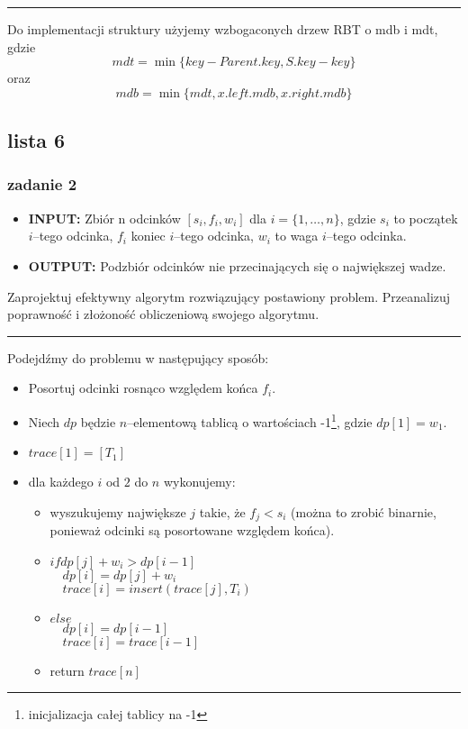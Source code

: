 \documentclass[11pt,a4paper]{article}
\begin{document}
\bigskip
\hrule
\bigskip

Do implementacji struktury użyjemy wzbogaconych drzew RBT o mdb i mdt, gdzie
\[
    mdt = \min\{key- Parent.key, S.key-key\}
\]
oraz
\[
    mdb = \min\{mdt, x.left.mdb, x.right.mdb\}
\]

\subsection{lista 6}
\subsubsection{zadanie 2}
\begin{itemize}
    \item \textbf{INPUT:} Zbiór n odcinków $[s_i, f_i, w_i]$ dla $i = \{1,\dots, n\}$, gdzie $s_i$ to początek $i$--tego odcinka, $f_i$ koniec $i$--tego odcinka, $w_i$ to waga $i$--tego odcinka.
    \item \textbf{OUTPUT:} Podzbiór odcinków nie przecinających się o największej wadze.
\end{itemize}
Zaprojektuj efektywny algorytm rozwiązujący postawiony problem. Przeanalizuj poprawność i złożoność obliczeniową swojego algorytmu.

\bigskip
\hrule
\bigskip

Podejdźmy do problemu w następujący sposób:
\begin{itemize}
    \item Posortuj odcinki rosnąco względem końca $f_i$.
    \item Niech $dp$ będzie $n$--elementową tablicą o wartościach -1\footnote{inicjalizacja całej tablicy na -1}, gdzie $dp[1]=w_1$.
    \item $trace[1] = [T_1]$
    \item dla każdego $i$ od $2$ do $n$ wykonujemy:
        \begin{itemize}
            \item wyszukujemy największe $j$ takie, że $f_j < s_i$ (można to zrobić binarnie, ponieważ odcinki są posortowane względem końca).
            \item $if dp[j] + w_i > dp[i-1]$\\
                $\quad dp[i]=dp[j] + w_i$\\
                $\quad trace[i] = insert(trace[j], T_i)$
            \item $else$\\
                $\quad dp[i] = dp[i-1]$\\
                $\quad trace[i] = trace[i-1]$
            \item return $trace[n]$
        \end{itemize}
\end{itemize}
\end{document}
